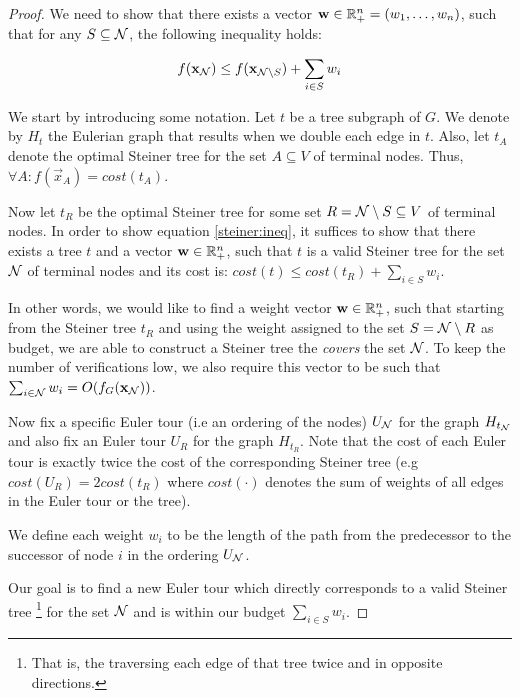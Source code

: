 \begin{proof}
We need to show that there exists a vector $\mathbf{w}\in \mathbb{R}_+^n=(w_1,\dots,w_n)$, such that for any $S\subseteq\mathcal{N}$, the following inequality holds:

 \begin{equation}\label{steiner:ineq} f(\mathbf{x}_{\mathcal{N}}) \le f(\mathbf{x}_{\mathcal{N}\setminus S}) + \sum_{i \in S} w_i
 \end{equation}

We start by introducing some notation. Let $t$ be a tree subgraph of $G$. We denote by $H_t$ the Eulerian graph that results when we double each edge in $t$. Also,
let $t_A$ denote the optimal Steiner tree for the set $A\subseteq V$ of terminal nodes. Thus, $\forall A: f(\vec{x}_A)=cost(t_A)$.

Now let $t_R$ be the optimal Steiner tree for some set $R=\mathcal{N}\setminus S\subseteq V$ of terminal nodes. In order to show equation \eqref{steiner:ineq}, it suffices to show that
there exists a tree $t$ and a vector $\mathbf{w}\in \mathbb{R}_+^n$, such that $t$ is a valid Steiner tree for the set $\mathcal{N}$ of terminal nodes and its cost is:
$cost(t)\le cost(t_R)+\sum_{i\in S}w_i$.

In other words, we would like to find a weight vector $\mathbf{w}\in \mathbb{R}_+^n$, such that starting from the Steiner tree $t_R$ and using the weight assigned to the
set $ S=\mathcal{N}\setminus R$ as budget, we are able to construct a Steiner tree the \emph{covers} the set $\mathcal{N}$. To keep the number of verifications low, we also
require this vector to be such that $\sum_{i\in \mathcal{N}}w_i =O(f_G(\mathbf{x}_{\mathcal{N}}))$.

Now fix a specific Euler tour (i.e an ordering of the nodes) $U_{\mathcal{N}}$ for the graph $H_{t_{\mathcal{N}}}$ and also fix an Euler tour  $U_R$ for the graph $H_{t_R}$.
Note that the cost of each Euler tour is exactly twice the cost of the corresponding Steiner tree (e.g $cost(U_R)=2cost(t_R)$ where $cost(\cdot)$ denotes the sum of
weights of all edges in the Euler tour or the tree).

We define each weight $w_i$ to be the length of the path from the predecessor to the successor of node $i$ in the ordering $U_{\mathcal{N}}$.

Our goal is to find a new Euler tour which directly corresponds to a valid Steiner tree \footnote{That is, the traversing each edge of that tree twice and in
opposite directions.} for the set $\mathcal{N}$ and is within our budget $\sum_{i\in S}w_i$.


\end{proof}
